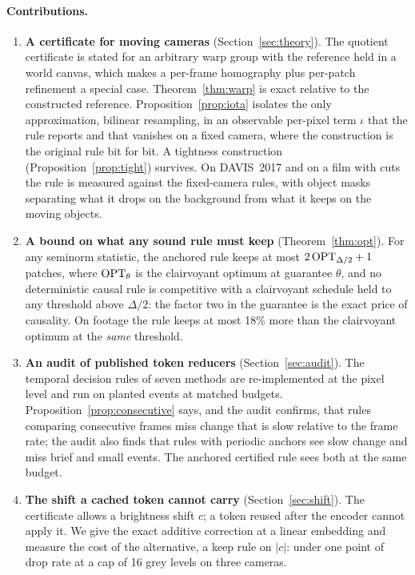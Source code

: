 \paragraph{Contributions.}
\begin{enumerate}
\item \textbf{A certificate for moving cameras} (Section~\ref{sec:theory}). The quotient certificate is stated for an arbitrary warp group with the reference held in a world canvas, which makes a per-frame homography plus per-patch refinement a special case. Theorem~\ref{thm:warp} is exact relative to the constructed reference. Proposition~\ref{prop:iota} isolates the only approximation, bilinear resampling, in an observable per-pixel term $\iota$ that the rule reports and that vanishes on a fixed camera, where the construction is the original rule bit for bit. A tightness construction (Proposition~\ref{prop:tight}) survives. On DAVIS~2017 and on a film with cuts the rule is measured against the fixed-camera rules, with object masks separating what it drops on the background from what it keeps on the moving objects.
\item \textbf{A bound on what any sound rule must keep} (Theorem~\ref{thm:opt}). For any seminorm statistic, the anchored rule keeps at most $2\,\mathrm{OPT}_{\Delta/2} + 1$ patches, where $\mathrm{OPT}_\theta$ is the clairvoyant optimum at guarantee $\theta$, and no deterministic causal rule is competitive with a clairvoyant schedule held to any threshold above $\Delta/2$: the factor two in the guarantee is the exact price of causality. On footage the rule keeps at most 18\% more than the clairvoyant optimum at the \emph{same} threshold.
\item \textbf{An audit of published token reducers} (Section~\ref{sec:audit}). The temporal decision rules of seven methods are re-implemented at the pixel level and run on planted events at matched budgets. Proposition~\ref{prop:consecutive} says, and the audit confirms, that rules comparing consecutive frames miss change that is slow relative to the frame rate; the audit also finds that rules with periodic anchors see slow change and miss brief and small events. The anchored certified rule sees both at the same budget.
\item \textbf{The shift a cached token cannot carry} (Section~\ref{sec:shift}). The certificate allows a brightness shift $c$; a token reused after the encoder cannot apply it. We give the exact additive correction at a linear embedding and measure the cost of the alternative, a keep rule on $|c|$: under one point of drop rate at a cap of 16 grey levels on three cameras.
\end{enumerate}

